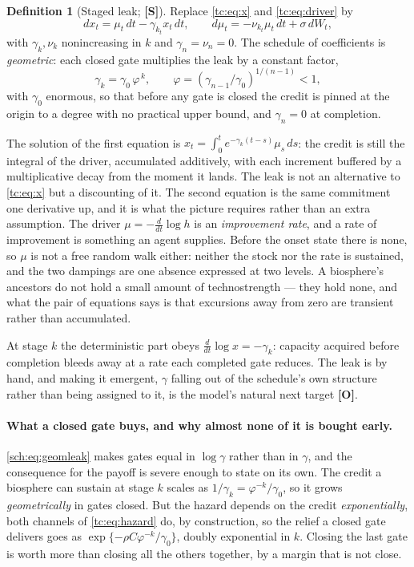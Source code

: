 \documentclass[11pt]{article}
\numberwithin{equation}{section}
\theoremstyle{plain}
\theoremstyle{definition}
\newtheorem{definition}[theorem]{Definition}
\theoremstyle{remark}
\begin{document}
\begin{definition}[Staged leak; \textbf{[S]}]\label{sch:def:leak}
Replace \eqref{tc:eq:x} and \eqref{tc:eq:driver} by
\begin{equation}\label{sch:eq:leak}
dx_t=\mu_t\,dt-\gamma_{k_t}x_t\,dt,
\qquad
d\mu_t=-\nu_{k_t}\mu_t\,dt+\sigma\,dW_t,
\end{equation}
with $\gamma_k,\nu_k$ nonincreasing in $k$ and $\gamma_n=\nu_n=0$. The
schedule of coefficients is \emph{geometric}: each closed gate
multiplies the leak by a constant factor,
\begin{equation}\label{sch:eq:geomleak}
\gamma_k=\gamma_0\,\varphi^{\,k},\qquad
\varphi=(\gamma_{n-1}/\gamma_0)^{1/(n-1)}<1,
\end{equation}
with $\gamma_0$ enormous, so that before any gate is closed the credit
is pinned at the origin to a degree with no practical upper bound, and $\gamma_n=0$ at completion.
\end{definition}

The solution of the first equation is
$x_t=\int_0^te^{-\gamma_k(t-s)}\mu_s\,ds$: the credit is still the
integral of the driver, accumulated additively, with each increment
buffered by a multiplicative decay from the moment it lands. The leak is
not an alternative to \eqref{tc:eq:x} but a discounting of it. The second equation is the same commitment one derivative up, and it is
what the picture requires rather than an extra assumption. The driver
$\mu=-\tfrac{d}{dt}\log h$ is an \emph{improvement rate}, and a rate of
improvement is something an agent supplies. Before the onset state there
is none, so $\mu$ is not a free random walk either: neither the stock nor
the rate is sustained, and the two dampings are one absence expressed at
two levels. A biosphere's ancestors do not hold a small amount of
technostrength --- they hold none, and what the pair of equations says is
that excursions away from zero are transient rather than accumulated.

At stage $k$ the deterministic part obeys $\tfrac{d}{dt}\log x=-\gamma_k$:
capacity acquired before completion bleeds away at a rate each completed
gate reduces. The leak is by hand, and making it emergent, $\gamma$
falling out of the schedule's own structure rather than being assigned
to it, is the model's natural next target \textbf{[O]}.

\paragraph{What a closed gate buys, and why almost none of it is
bought early.}\label{sch:rem:backloaded}
\eqref{sch:eq:geomleak} makes gates equal in $\log\gamma$ rather than in
$\gamma$, and the consequence for the payoff is severe enough to state
on its own. The credit a biosphere can sustain at stage $k$ scales as
$1/\gamma_k=\varphi^{-k}/\gamma_0$, so it grows \emph{geometrically} in
gates closed. But the hazard depends on the credit \emph{exponentially}, both channels of \eqref{tc:eq:hazard} do, by construction, so the
relief a closed gate delivers goes as
$\exp\{-\rho C\varphi^{-k}/\gamma_0\}$, doubly exponential in $k$.
Closing the last gate is worth more than closing all the others
together, by a margin that is not close.
\end{document}

